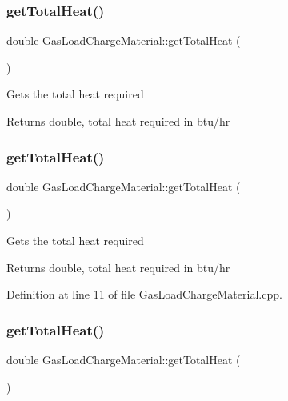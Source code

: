 \subsubsection{\texorpdfstring{get\+Total\+Heat()}{getTotalHeat()}\hspace{0.1cm}{\footnotesize\ttfamily [1/3]}}
{\footnotesize\ttfamily double Gas\+Load\+Charge\+Material\+::get\+Total\+Heat (\begin{DoxyParamCaption}{ }\end{DoxyParamCaption})}

Gets the total heat required

\begin{DoxyReturn}{Returns}
double, total heat required in btu/hr 
\end{DoxyReturn}
\mbox{\label{class_gas_load_charge_material_a4f831537652ca09c4539982c626cc164}} 
\subsubsection{\texorpdfstring{get\+Total\+Heat()}{getTotalHeat()}\hspace{0.1cm}{\footnotesize\ttfamily [2/3]}}
{\footnotesize\ttfamily double Gas\+Load\+Charge\+Material\+::get\+Total\+Heat (\begin{DoxyParamCaption}{ }\end{DoxyParamCaption})}

Gets the total heat required

\begin{DoxyReturn}{Returns}
double, total heat required in btu/hr 
\end{DoxyReturn}


Definition at line 11 of file Gas\+Load\+Charge\+Material.\+cpp.

\mbox{\label{class_gas_load_charge_material_a4f831537652ca09c4539982c626cc164}} 
\subsubsection{\texorpdfstring{get\+Total\+Heat()}{getTotalHeat()}\hspace{0.1cm}{\footnotesize\ttfamily [3/3]}}
{\footnotesize\ttfamily double Gas\+Load\+Charge\+Material\+::get\+Total\+Heat (\begin{DoxyParamCaption}{ }\end{DoxyParamCaption})}

